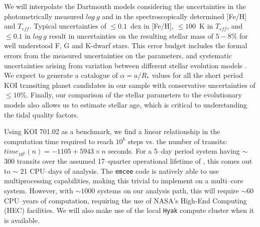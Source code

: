 We will interpolate the Dartmouth models considering the uncertainties
in the photometrically measured $log~g$ and in the spectroscopically
determined [Fe/H] and $T_{eff}$.  Typical uncertainties of $\le
0.1$~dex in [Fe/H], $\le 100$~K in $T_{eff}$, and $\le 0.1$ in $log~g$
result in uncertainties on the resulting stellar mass of $5-8$\% for
well understood F, G and K-dwarf stars.  This error budget includes
the formal errors from the measured uncertainties on the parameters,
and systematic uncertainties arising from variation between different
stellar evolution models
\citep[2-4\%;][]{Southworth2009}.  We expect to generate a
catalogue of $\alpha = a/R_*$ values for all the short period KOI
transiting planet candidates in our sample with conservative
uncertainties of $\le 10$\%.  Finally, our comparison of the stellar
parameters to the evolutionary models also allows us to estimate
stellar age, which is critical to understanding the tidal quality
factors.

\medskip
{\centerline{}}
\smallskip


Using KOI 701.02 as a benchmark, we find a linear relationship in the
computation time required to reach $10^6$ steps vs. the number of
transits: $time_{10^6}(n) = -1105 + 5943 \times n$ seconds.
%
For a 5--day period system having $\sim$ 300 transits over the assumed
17--quarter operational lifetime of \kepler, this comes out to $\sim$
21 CPU--days of analysis.  The {\tt emcee} code is natively able to
use multiprocessing capabilities, making this trivial to implement on
a multi--core system.  However, with $\sim 1000$ systems on our
analysis path, this will require $\sim 60$ CPU--years of computation,
requiring the use of NASA's High-End Computing (HEC) facilities.  We
will also make use of the local {\tt Hyak} compute cluster when it is
available.

